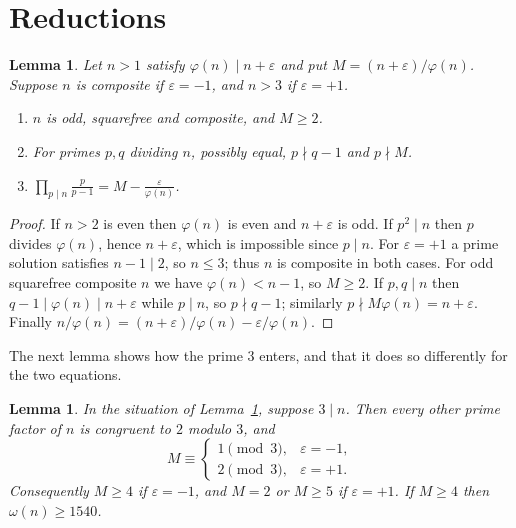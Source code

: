 \documentclass[11pt,reqno]{amsart}
\numberwithin{equation}{section}
\theoremstyle{plain}
\newtheorem{lemma}[theorem]{Lemma}
\theoremstyle{definition}
\theoremstyle{remark}
\begin{document}
\section{Reductions}\label{sec:elem}

\begin{lemma}\label{lem:basic}
Let $n>1$ satisfy $\varphi(n)\mid n+\varepsilon$ and put
$M=(n+\varepsilon)/\varphi(n)$. Suppose $n$ is composite if
$\varepsilon=-1$, and $n>3$ if $\varepsilon=+1$.
\begin{enumerate}[label=\textup{(\roman*)}]
\item $n$ is odd, squarefree and composite, and $M\ge2$.
\item For primes $p,q$ dividing $n$, possibly equal, $p\nmid q-1$ and
  $p\nmid M$.
\item $\displaystyle\prod_{p\mid n}\frac{p}{p-1}
  =M-\frac{\varepsilon}{\varphi(n)}$.
\end{enumerate}
\end{lemma}

\begin{proof}
If $n>2$ is even then $\varphi(n)$ is even and $n+\varepsilon$ is odd.
If $p^2\mid n$ then $p$ divides $\varphi(n)$, hence $n+\varepsilon$,
which is impossible since $p\mid n$. For $\varepsilon=+1$ a prime
solution satisfies $n-1\mid2$, so $n\le3$; thus $n$ is composite in
both cases. For odd squarefree composite $n$ we have
$\varphi(n)<n-1$, so $M\ge2$. If $p,q\mid n$ then
$q-1\mid\varphi(n)\mid n+\varepsilon$ while $p\mid n$, so
$p\nmid q-1$; similarly $p\nmid M\varphi(n)=n+\varepsilon$. Finally
$n/\varphi(n)=(n+\varepsilon)/\varphi(n)-\varepsilon/\varphi(n)$.
\end{proof}

The next lemma shows how the prime $3$ enters, and that it does so
differently for the two equations.

\begin{lemma}\label{lem:three}
In the situation of Lemma~\ref{lem:basic}, suppose $3\mid n$. Then
every other prime factor of $n$ is congruent to $2$ modulo $3$, and
\[
  M\equiv\begin{cases}1\pmod3,&\varepsilon=-1,\\
  2\pmod3,&\varepsilon=+1.\end{cases}
\]
Consequently $M\ge4$ if $\varepsilon=-1$, and $M=2$ or $M\ge5$ if
$\varepsilon=+1$. If $M\ge4$ then $\omega(n)\ge1540$.
\end{lemma}
\end{document}
